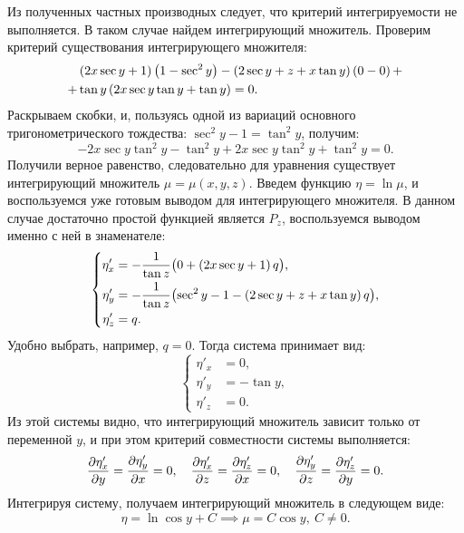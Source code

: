		Из полученных частных производных следует, что критерий интегрируемости не выполняется. В таком случае найдем интегрирующий множитель. Проверим критерий существования интегрирующего множителя:
		\[ \begin{split}
			&\left( 2x \sec{y} + 1 \right) \left( 
				1 - \sec^2{y}
			 \right) -
			\left( 2 \sec{y} + z + x \tan{y} \right) \left( 
				0 - 0
			 \right) + \\ +&
			\tan{y} \left( 
				2x \sec{y} \tan{y} + \tan{y}
			 \right) = 0. 
		\end{split} \]
		Раскрываем скобки, и, пользуясь одной из вариаций основного тригонометрического тождества: $\sec^2{y} - 1 = \tan^2{y}$, получим:
		\[ -2x \sec{y} \tan^2{y} - \tan^2{y} + 2x \sec{y} \tan^2{y} + \tan^2{y} = 0. \]
		Получили верное равенство, следовательно для уравнения существует интегрирующий множитель $\mu = \mu(x, y, z)$. Введем функцию $\eta = \ln{\mu}$, и воспользуемся уже готовым выводом для интегрирующего множителя. В данном случае достаточно простой функцией является $P_z$, воспользуемся выводом именно с ней в знаменателе:
		\[ \left\lbrace \begin{split} 
			\eta'_x &= -\frac{1}{\tan{z}} \bigl( 0 + \left( 2x \sec{y} + 1 \right) q \bigr), \\
			\eta'_y &= -\frac{1}{\tan{z}} \bigl( \sec^2{y} - 1 - \left( 2 \sec{y} + z + x \tan{y} \right) q \bigr), \\
			\eta'_z &= q.
		\end{split} \right. \]
		Удобно выбрать, например, $q = 0$. Тогда система принимает вид:
		\[ \left\lbrace \begin{split} 
			\eta'_x &= 0, \\
			\eta'_y &= -\tan{y}, \\
			\eta'_z &= 0.
		\end{split} \right. \]	
		Из этой системы видно, что интегрирующий множитель зависит только от переменной $y$, и при этом критерий совместности системы выполняется: 
		\[ \dfrac{\partial \eta'_x}{\partial y} = \dfrac{\partial \eta'_y}{\partial x} = 0, \quad \dfrac{\partial \eta'_x}{\partial z} = \dfrac{\partial \eta'_z}{\partial x} = 0, \quad \dfrac{\partial \eta'_y}{\partial z} = \dfrac{\partial \eta'_z}{\partial y} = 0. \]
		Интегрируя систему, получаем интегрирующий множитель в следующем виде:
		\[ \eta = \ln{\cos{y}} + C \implies \mu = C \cos{y}, ~ C \neq 0. \]

